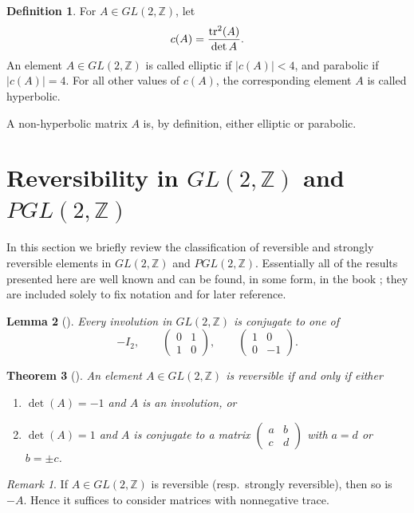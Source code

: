 \documentclass[12pt]{amsart}
\theoremstyle{plain}
\newtheorem{theorem}{Theorem}[section]
\newtheorem{lemma}[theorem]{Lemma}
\theoremstyle{definition}
\newtheorem{definition}[theorem]{Definition}
\theoremstyle{remark}
\newtheorem{remark}{Remark}
\begin{document}
\begin{definition}
For $A \in GL(2, \mathbb Z)$, let  
$$c(A)=\frac{{\rm tr}^2(A)}{\det A}.$$
    An element $A\in GL(2,\mathbb{Z})$ is called elliptic if $|c(A)|<4$, and parabolic if $|c(A)|= 4$. For all other values of 
 $c(A)$, the corresponding element $A$ is called hyperbolic.
\end{definition}
A non-hyperbolic matrix $A$ is, by definition, either elliptic or parabolic.



\section{Reversibility in $GL(2,\mathbb Z)$ and $PGL(2,\mathbb Z)$}\label{glz}

In this section we briefly review the classification of reversible and strongly reversible elements in \(GL(2,\mathbb{Z})\) and \(PGL(2,\mathbb{Z})\). Essentially all of the results presented here are well known and can be found, in some form, in the book \cite{IS}; they are included solely to fix notation and for later reference.


\begin{lemma}[{\cite[Lemma~3.2]{IS}}]\label{GL2Z-involutions} Every involution in $GL(2,\mathbb Z)$ is conjugate to one of
\[
-I_2,\qquad 
\begin{pmatrix}0&1\\1&0\end{pmatrix},\qquad
\begin{pmatrix}1&0\\0&-1\end{pmatrix}.
\]
\end{lemma}


\begin{theorem}[{\cite[Theorem~4.1]{IS}}]\label{GL2Z-reversible}An element $A\in GL(2,\mathbb Z)$ is reversible if and only if either
\begin{enumerate}
\item $\det(A)=-1$ and $A$ is an involution, or
\item $\det(A)=1$ and $A$ is conjugate to a matrix
\(
\begin{pmatrix}a&b\\c&d\end{pmatrix}
\)
with $a=d$ or $b=\pm c$.
\end{enumerate}
\end{theorem}

\begin{remark}
If $A\in GL(2,\mathbb Z)$ is reversible (resp.\ strongly reversible), then so is $-A$.
Hence it suffices to consider matrices with nonnegative trace.
\end{remark}
\end{document}
